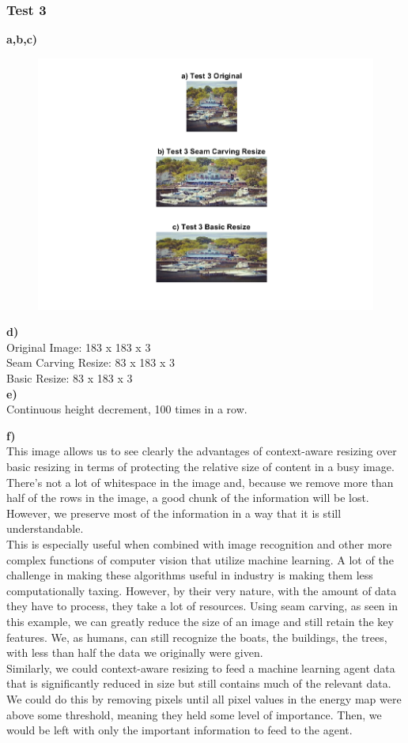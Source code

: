 \documentclass[12pt]{article}
\begin{document}
\subsubsection*{Test 3}
\textbf{a,b,c)}
\begin{figure}[H]
  \includegraphics[width=\linewidth]{PS1_Q6_3.png}
\end{figure}

\noindent
\textbf{d)} \\
Original Image: 183 x 183 x 3 \\
Seam Carving Resize: 83 x 183 x 3 \\
Basic Resize: 83 x 183 x 3 \\

\noindent
\textbf{e)} \\
Continuous height decrement, 100 times in a row.

\noindent
\textbf{f)} \\
This image allows us to see clearly the advantages of context-aware resizing over basic resizing in terms of protecting the relative size of content in a busy image. There's not a lot of whitespace in the image and, because we remove more than half of the rows in the image, a good chunk of the information will be lost. However, we preserve most of the information in a way that it is still understandable. \\
This is especially useful when combined with image recognition and other more complex functions of computer vision that utilize machine learning. A lot of the challenge in making these algorithms useful in industry is making them less computationally taxing. However, by their very nature, with the amount of data they have to process, they take a lot of resources. Using seam carving, as seen in this example, we can greatly reduce the size of an image and still retain the key features. We, as humans, can still recognize the boats, the buildings, the trees, with less than half the data we originally were given. \\
Similarly, we could context-aware resizing to feed a machine learning agent data that is significantly reduced in size but still contains much of the relevant data. We could do this by removing pixels until all pixel values in the energy map were above some threshold, meaning they held some level of importance. Then, we would be left with only the important information to feed to the agent.
\end{document}
